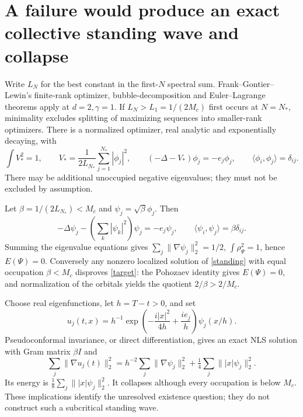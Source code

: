 \documentclass[11pt]{article}
\begin{document}
\section{A failure would produce an exact collective standing wave and collapse}
Write $L_N$ for the best constant in the first-$N$ spectral sum.
Frank--Gontier--Lewin's finite-rank optimizer, bubble-decomposition and
Euler--Lagrange theorems apply at $d=2,\gamma=1$.
If $L_N>L_1=1/(2M_c)$ first occurs at $N=N_*$, minimality excludes
splitting of maximizing sequences into smaller-rank optimizers.
There is a normalized optimizer, real analytic and exponentially decaying,
with
\[
 \int V_*^2=1,\qquad
 V_*=\frac1{2L_{N_*}}\sum_{j=1}^{N_*}|\phi_j|^2,\qquad
 (-\Delta-V_*)\phi_j=-e_j\phi_j,\qquad
 \langle\phi_i,\phi_j\rangle=\delta_{ij}.
\]
There may be additional unoccupied negative eigenvalues; they must not
be excluded by assumption.

Let $\beta=1/(2L_{N_*})<M_c$ and $\psi_j=\sqrt{\beta}\phi_j$. Then
\begin{equation}\label{standing}
 -\Delta\psi_j-\left(\sum_k|\psi_k|^2\right)\psi_j=-e_j\psi_j,\qquad
 \langle\psi_i,\psi_j\rangle=\beta\delta_{ij}.
\end{equation}
Summing the eigenvalue equations gives
$\sum_j\|\nabla\psi_j\|_2^2=1/2$, $\int\rho_\Psi^2=1$, hence $E(\Psi)=0$.
Conversely any nonzero localized solution of \eqref{standing} with
equal occupation $\beta<M_c$ disproves \eqref{target}:
the Pohozaev identity gives $E(\Psi)=0$, and normalization of the
orbitals yields the quotient $2/\beta>2/M_c$.

Choose real eigenfunctions, let $h=T-t>0$, and set
\[
 u_j(t,x)=h^{-1}
 \exp\!\left(-\frac{i|x|^2}{4h}+\frac{ie_j}{h}\right)\psi_j(x/h).
\]
Pseudoconformal invariance, or direct differentiation, gives an exact
NLS solution with Gram matrix $\beta I$ and
\[
 \sum_j\|\nabla u_j(t)\|_2^2
 =h^{-2}\sum_j\|\nabla\psi_j\|_2^2+
   \tfrac14\sum_j\||x|\psi_j\|_2^2.
\]
Its energy is $\frac18\sum_j\||x|\psi_j\|_2^2$.
It collapses although every occupation is below $M_c$.
These implications identify the unresolved existence question;
they do not construct such a subcritical standing wave.
\end{document}

